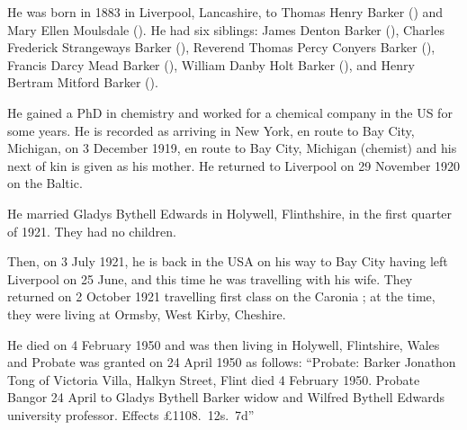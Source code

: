 
He was born in 1883 \cite{JTBarkerBirth} in Liverpool, Lancashire, to Thomas Henry Barker () and Mary Ellen Moulsdale (). He had six siblings:  James Denton Barker (), Charles Frederick Strangeways Barker (),  Reverend Thomas Percy Conyers Barker (), Francis Darcy Mead Barker (), William Danby Holt Barker (), and Henry Bertram Mitford Barker (). 

He gained a PhD in chemistry and worked for a chemical company in the US for some years. He is recorded as arriving in New York, en route to Bay City, Michigan, on 3 December 1919, en route to Bay City, Michigan (chemist) and his next of kin is given as his mother. He returned to Liverpool on 29 November 1920 on the Baltic.\cite{JTBarkerTravel1}

He married Gladys Bythell Edwards in Holywell, Flinthshire, in the first quarter of 1921. \cite{JTBarkerMarriage} They had  no children.

Then, on 3 July 1921, he is back in the USA on his way to Bay City having left Liverpool on 25 June, and this time he was travelling with his wife. They returned on 2 October 1921 travelling first class on the Caronia \cite{JTBarkerTravel2};  at the time,  they were living at Ormsby, West Kirby, Cheshire. 

He died on 4 February 1950 and was then living in Holywell, Flintshire, Wales and Probate was granted  on 24 April 1950 as follows:
``Probate: Barker Jonathon Tong of Victoria Villa, Halkyn Street, Flint died 4 February 1950. Probate Bangor 24 April to Gladys Bythell Barker widow and Wilfred Bythell Edwards university professor. Effects \pounds1108.~12s.~7d''
